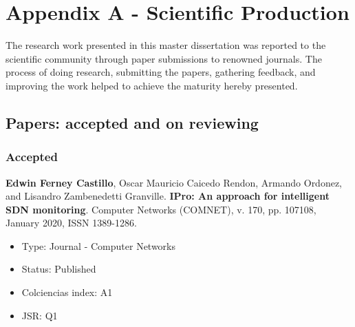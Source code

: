 \appendix
{}
\chapter{Appendix A - Scientific Production}
The research work presented in this master dissertation was reported to the scientific community through paper submissions to renowned journals. The process of doing research, submitting the papers, gathering feedback, and improving the work helped to achieve the maturity hereby presented.

\section{Papers: accepted and on reviewing}

\subsection{Accepted}
\textbf{Edwin Ferney Castillo}, Oscar Mauricio Caicedo Rendon, Armando Ordonez, and Lisandro Zambenedetti Granville. \textbf{IPro: An approach for intelligent SDN monitoring}. Computer Networks (COMNET), v. 170, pp. 107108, January 2020, ISSN 1389-1286.

\begin{itemize}
    \item Type: Journal - Computer Networks
    \item Status: Published
    \item Colciencias index: A1
    \item JSR: Q1 
\end{itemize}{}


